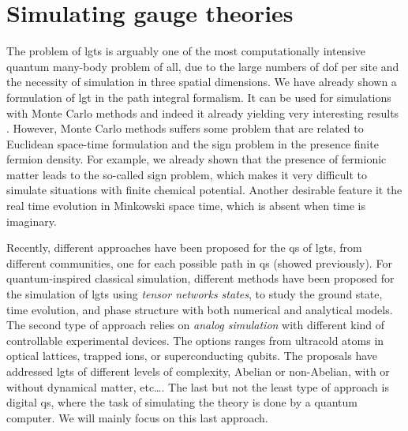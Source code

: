 \section{Simulating gauge theories}
\label{sec:simulating_gauge_theories}


The problem of \ac{lgt}s is arguably one of the most computationally intensive quantum many-body problem of all, due to the large numbers of \ac{dof} per site and the necessity of simulation in three spatial dimensions.
We have already shown a formulation of \ac{lgt} in the path integral formalism.
It can be used for simulations with Monte Carlo methods and indeed it already yielding very interesting results \citneeded.
However, Monte Carlo methods suffers some problem that are related to Euclidean space-time formulation and the sign problem in the presence finite fermion density.
For example, we already shown that the presence of fermionic matter leads to the so-called sign problem, which makes it very difficult to simulate situations with finite chemical potential.
Another desirable feature it the real time evolution in Minkowski space time, which is absent when time is imaginary.

Recently, different approaches have been proposed for the \ac{qs} of \ac{lgt}s, from different communities, one for each possible path in \ac{qs} (showed previously).
For quantum-inspired classical simulation, different methods have been proposed for the simulation of \ac{lgt}s using \emph{tensor networks states}, to study the ground state, time evolution, and phase structure with both numerical and analytical models.
The second type of approach relies on \emph{analog simulation} with different kind of controllable experimental devices.
The options ranges from ultracold atoms in optical lattices\citneeded, trapped ions\citneeded, or superconducting qubits\citneeded.
The proposals have addressed \ac{lgt}s of different levels of complexity, Abelian or non-Abelian, with or without dynamical matter, etc\dots.
The last but not the least type of approach is digital \ac{qs}, where the task of simulating the theory is done by a quantum computer.
We will mainly focus on this last approach.


